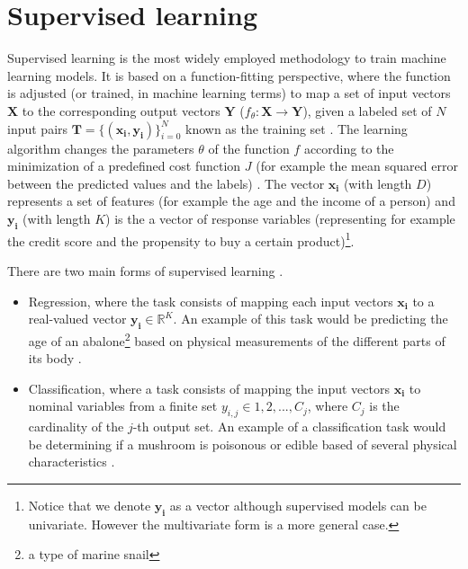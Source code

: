 \section{Supervised learning}
Supervised learning is the most widely employed methodology to train machine learning models. It is based on a function-fitting perspective, where the function is adjusted (or trained, in machine learning terms) to map a set of input vectors $\mathbf{X}$ to the corresponding output vectors $\mathbf{Y}$ ($f_\theta:\mathbf{X}\rightarrow \mathbf{Y}$), given a labeled set of $N$ input pairs $\mathbf{T}=\{(\mathbf{x_i},\mathbf{y_i})\}_{i=0}^{N}$ known as the training set \cite{theodoridis2015}. The learning algorithm changes the parameters $\theta$ of the function $f$ according to the minimization of a predefined cost function $J$ (for example the mean squared error between the predicted values and the labels) \cite{hastie2009}. The vector $\mathbf{x_i}$ (with length $D$) represents a set of features (for example the age and the income of a person)  and $\mathbf{y_i}$ (with length $K$) is the a vector of response variables (representing for example the credit score and the propensity to buy a certain product)\footnote{Notice that we denote $\mathbf{y_i}$ as a vector although supervised models can be univariate. However the multivariate form is a more general case.}.

There are two main forms of supervised learning  \cite{murphy2012}.

\begin{itemize}
	\item Regression, where the task consists of mapping each input vectors $\mathbf{x_i}$ to a real-valued vector $\mathbf{y_i} \in \mathbb{R}^K$. An example of this task would be predicting the age of an abalone\footnote{a type of marine snail} based on physical measurements of the different parts of its body \cite{dua2019abalone}.
	\item Classification, where a task consists of mapping the input vectors $\mathbf{x_i}$ to nominal variables from a finite set $y_{i,j} \in {1,2,...,C_j}$, where $C_j$ is the cardinality of the $j$-th output set. An example of a classification task would be determining if a mushroom is poisonous or edible based of several physical characteristics \cite{dua2019mushroom}.
\end{itemize}

